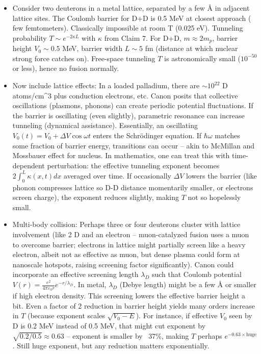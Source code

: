 \documentclass[11pt]{article}
\begin{document}
\begin{itemize}

\item 
Consider two deuterons in a metal lattice, separated by a few Å in adjacent lattice sites. The Coulomb barrier for D+D is 0.5 MeV at closest approach ( few femtometers). Classically impossible at room T (0.025 eV). Tunneling probability $T \sim e^{-2\kappa L}$ with $\kappa$ from Claim 7. For D+D, $m \approx 2m_p$, barrier height $V_0 \sim 0.5$ MeV, barrier width $L \sim 5$ fm (distance at which nuclear strong force catches on). Free-space tunneling $T$ is astronomically small ($10^{-50}$ or less), hence no fusion normally.




\item 
Now include lattice effects: In a loaded palladium, there are $\sim 10^{22}$ D atoms/cm^3 plus conduction electrons, etc. Canon posits that collective oscillations (plasmons, phonons) can create periodic potential fluctuations. If the barrier is oscillating (even slightly), parametric resonance can increase tunneling (dynamical assistance). Essentially, an oscillating $V_0(t) = V_0 + \Delta V\cos\omega t$ enters the Schrödinger equation. If $\hbar\omega$ matches some fraction of barrier energy, transitions can occur – akin to McMillan and Mossbauer effect for nucleus. In mathematics, one can treat this with time-dependent perturbation: the effective tunneling exponent becomes $2\int_0^L \kappa(x,t) dx$ averaged over time. If occasionally $\Delta V$ lowers the barrier (like phonon compresses lattice so D-D distance momentarily smaller, or electrons screen charge), the exponent reduces slightly, making $T$ not so hopelessly small.




\item 
Multi-body collision: Perhaps three or four deuterons cluster with lattice involvement (like 2 D and an electron – muon-catalyzed fusion uses a muon to overcome barrier; electrons in lattice might partially screen like a heavy electron, albeit not as effective as muon, but dense plasma could form at nanoscale hotspots, raising screening factor significantly). Canon could incorporate an effective screening length $\lambda_D$ such that Coulomb potential $V(r) = \frac{e^2}{4\pi\varepsilon_0 r}e^{-r/\lambda_D}$. In metal, $\lambda_D$ (Debye length) might be a few Å or smaller if high electron density. This screening lowers the effective barrier height a bit. Even a factor of 2 reduction in barrier height yields many orders increase in $T$ (because exponent scales $\sqrt{V_0 - E}$). For instance, if effective $V_0$ seen by D is 0.2 MeV instead of 0.5 MeV, that might cut exponent by $\sqrt{0.2/0.5} \approx 0.63$ – exponent is smaller by ~37\%, making $T$ perhaps $e^{-0.63 \times \text{huge}}$. Still huge exponent, but any reduction matters exponentially.





\end{itemize}
\end{document}
